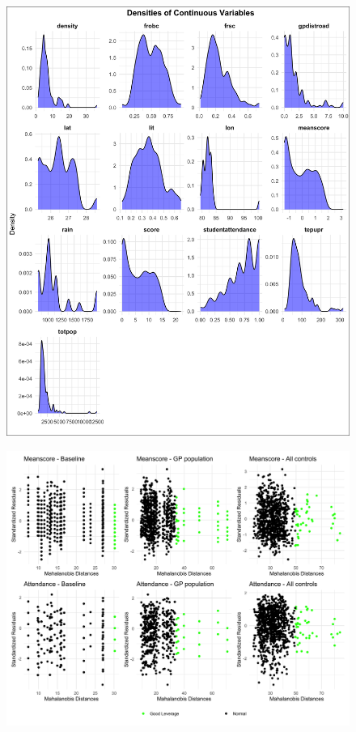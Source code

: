 \documentclass[12pt]{article}
\begin{document}
\begin{figure}[p]  %
    \centering
    \includegraphics[width=1\textwidth]{OUTPUT/MEDIA/score_density.png}  %
    \label{fig:density}
\end{figure}
\begin{figure}[p]  %
  \centering
  \includegraphics[width=1\textwidth]{OUTPUT/MEDIA/manhalobis.png}  %
  \label{fig:manhalobis}
\end{figure}
\end{document}
